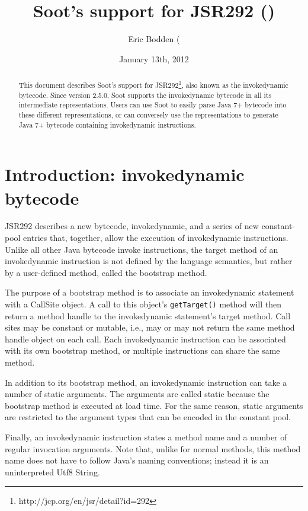 \documentclass{article}
\title{Soot's support for JSR292 (\id)}
\author{Eric Bodden
(\htmladdnormallink{eric.bodden@ec-spride.de)}{mailto:eric.bodden@ec-spride.de}}
\date{January 13th, 2012}
\newcommand{\id}{invokedynamic\xspace}
\begin{document}
\maketitle

\begin{abstract}
This document describes Soot's support for
JSR292\footnote{http://jcp.org/en/jsr/detail?id=292}, also known as the \id
bytecode. Since version 2.5.0, Soot supports the \id bytecode in all its
intermediate representations. Users can use Soot to easily parse Java 7+
bytecode into these different representations, or can conversely use the
representations to generate Java 7+ bytecode containing invokedynamic
instructions.
\end{abstract}

\section{Introduction: invokedynamic bytecode}

JSR292 describes a new bytecode, \id, and a series of new
constant-pool entries that, together, allow the execution of \id
instructions. Unlike all other Java bytecode invoke instructions, the
target method of an \id instruction is not defined by the language
semantics, but rather by a user-defined method, called the bootstrap
method. 

The purpose of a bootstrap method is to associate an \id
statement with a CallSite object. A call to this object's
\texttt{getTarget()} method will then return a method handle to the \id
statement's target method. Call sites may be constant or mutable,
i.e., may or may not return the same method handle object on
each call. Each \id instruction can be associated with its own
bootstrap method, or multiple instructions can share the same method. 

In
addition to its bootstrap method, an \id instruction can take a
number of static arguments. The
arguments are called static because the bootstrap method is executed
at load time. For the same reason, static arguments are restricted to
the argument types that can be encoded in the constant pool. 

Finally, an \id instruction states a method name and a
number of regular invocation arguments.  Note that, unlike for normal
methods, this method name does not have to follow Java's naming
conventions; instead it is an uninterpreted Utf8 String. 
\end{document}
